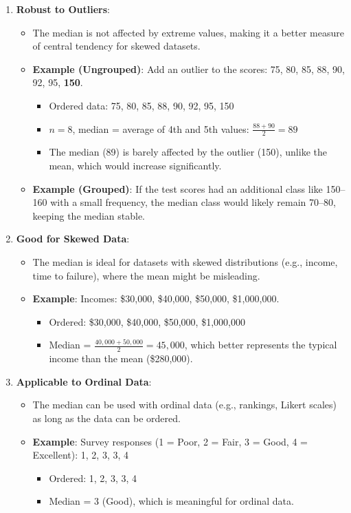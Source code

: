 \documentclass[11pt]{article}
\begin{document}
\begin{enumerate}
    \item \textbf{Robust to Outliers}:
    \begin{itemize}
        \item The median is not affected by extreme values, making it a better measure of central tendency for skewed datasets.
        \item \textbf{Example (Ungrouped)}: Add an outlier to the scores: 75, 80, 85, 88, 90, 92, 95, \textbf{150}.
        \begin{itemize}
            \item Ordered data: 75, 80, 85, 88, 90, 92, 95, 150
            \item $n = 8$, median = average of 4th and 5th values: $\frac{88 + 90}{2} = 89$
            \item The median (89) is barely affected by the outlier (150), unlike the mean, which would increase significantly.
        \end{itemize}
        \item \textbf{Example (Grouped)}: If the test scores had an additional class like 150--160 with a small frequency, the median class would likely remain 70--80, keeping the median stable.
    \end{itemize}

    \item \textbf{Good for Skewed Data}:
    \begin{itemize}
        \item The median is ideal for datasets with skewed distributions (e.g., income, time to failure), where the mean might be misleading.
        \item \textbf{Example}: Incomes: \$30,000, \$40,000, \$50,000, \$1,000,000.
        \begin{itemize}
            \item Ordered: \$30,000, \$40,000, \$50,000, \$1,000,000
            \item Median = $\frac{40,000 + 50,000}{2} = 45,000$, which better represents the typical income than the mean (\$280,000).
        \end{itemize}
    \end{itemize}

    \item \textbf{Applicable to Ordinal Data}:
    \begin{itemize}
        \item The median can be used with ordinal data (e.g., rankings, Likert scales) as long as the data can be ordered.
        \item \textbf{Example}: Survey responses (1 = Poor, 2 = Fair, 3 = Good, 4 = Excellent): 1, 2, 3, 3, 4
        \begin{itemize}
            \item Ordered: 1, 2, 3, 3, 4
            \item Median = 3 (Good), which is meaningful for ordinal data.
        \end{itemize}
    \end{itemize}


\end{enumerate}
\end{document}
